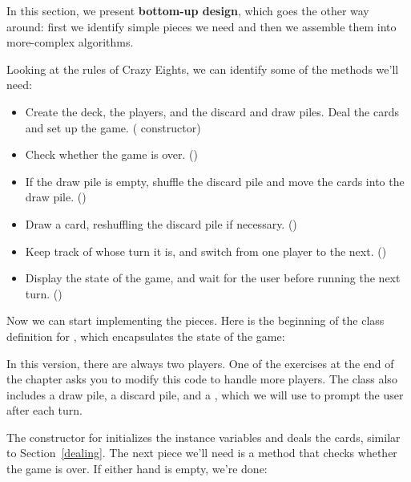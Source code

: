 In this section, we present {\bf bottom-up design}, which goes the other way around: first we identify simple pieces we need and then we assemble them into more-complex algorithms.

Looking at the rules of Crazy Eights, we can identify some of the methods we'll need:

\begin{itemize}

\item Create the deck, the players, and the discard and draw piles. Deal the cards and set up the game. ( constructor)

\item Check whether the game is over. ()

\item If the draw pile is empty, shuffle the discard pile and move the cards into the draw pile. ()

\item Draw a card, reshuffling the discard pile if necessary. ()

\item Keep track of whose turn it is, and switch from one player to the next. ()

\item Display the state of the game, and wait for the user before running the next turn. ()

\end{itemize}

Now we can start implementing the pieces.
Here is the beginning of the class definition for , which encapsulates the state of the game:


\begin{code}
public class Eights {

    private Player one;
    private Player two;
    private Hand drawPile;
    private Hand discardPile;
    private Scanner in;
\end{code}

In this version, there are always two players.
One of the exercises at the end of the chapter asks you to modify this code to handle more players.
The  class also includes a draw pile, a discard pile, and a , which we will use to prompt the user after each turn.

The constructor for  initializes the instance variables and deals the cards, similar to Section~\ref{dealing}.
%
%
%
%
%
%
%
The next piece we'll need is a method that checks whether the game is over.
If either hand is empty, we're done:

